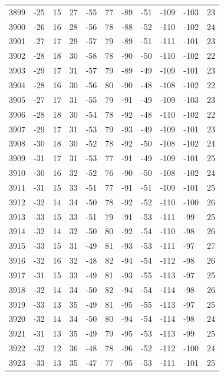 \begin{table}[H]
\begin{tabular}{lllllllllll}
3899 & -25 & 15 & 27 & -55 & 77 & -89 & -51 & -109 & -103 & 23 \\
3900 & -26 & 16 & 28 & -56 & 78 & -88 & -52 & -110 & -102 & 24 \\
3901 & -27 & 17 & 29 & -57 & 79 & -89 & -51 & -111 & -101 & 23 \\
3902 & -28 & 18 & 30 & -58 & 78 & -90 & -50 & -110 & -102 & 22 \\
3903 & -29 & 17 & 31 & -57 & 79 & -89 & -49 & -109 & -101 & 23 \\
3904 & -28 & 16 & 30 & -56 & 80 & -90 & -48 & -108 & -102 & 22 \\
3905 & -27 & 17 & 31 & -55 & 79 & -91 & -49 & -109 & -103 & 23 \\
3906 & -28 & 18 & 30 & -54 & 78 & -92 & -48 & -110 & -102 & 22 \\
3907 & -29 & 17 & 31 & -53 & 79 & -93 & -49 & -109 & -101 & 23 \\
3908 & -30 & 18 & 30 & -52 & 78 & -92 & -50 & -108 & -102 & 24 \\
3909 & -31 & 17 & 31 & -53 & 77 & -91 & -49 & -109 & -101 & 25 \\
3910 & -30 & 16 & 32 & -52 & 76 & -90 & -50 & -108 & -102 & 24 \\
3911 & -31 & 15 & 33 & -51 & 77 & -91 & -51 & -109 & -101 & 25 \\
3912 & -32 & 14 & 34 & -50 & 78 & -92 & -52 & -110 & -100 & 26 \\
3913 & -33 & 15 & 33 & -51 & 79 & -91 & -53 & -111 & -99 & 25 \\
3914 & -32 & 14 & 32 & -50 & 80 & -92 & -54 & -110 & -98 & 26 \\
3915 & -33 & 15 & 31 & -49 & 81 & -93 & -53 & -111 & -97 & 27 \\
3916 & -32 & 16 & 32 & -48 & 82 & -94 & -54 & -112 & -98 & 26 \\
3917 & -31 & 15 & 33 & -49 & 81 & -93 & -55 & -113 & -97 & 25 \\
3918 & -32 & 14 & 34 & -50 & 82 & -94 & -54 & -114 & -98 & 26 \\
3919 & -33 & 13 & 35 & -49 & 81 & -95 & -55 & -113 & -97 & 25 \\
3920 & -32 & 14 & 34 & -50 & 80 & -94 & -54 & -114 & -98 & 24 \\
3921 & -31 & 13 & 35 & -49 & 79 & -95 & -53 & -113 & -99 & 25 \\
3922 & -32 & 12 & 36 & -48 & 78 & -96 & -52 & -112 & -100 & 24 \\
3923 & -33 & 13 & 35 & -47 & 77 & -95 & -53 & -111 & -101 & 25 \\

\end{tabular}
\end{table}
